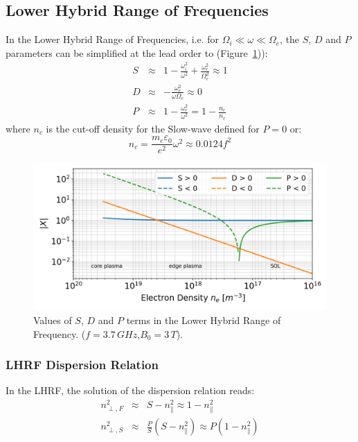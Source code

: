 \subsection{Lower Hybrid Range of Frequencies}\label{sec:lhcd}
In the Lower Hybrid Range of Frequencies, i.e. for $\Omega_i \ll \omega \ll \Omega_e$, the $S$, $D$ and $P$ parameters can be simplified at the lead order \cite[p.222]{Brambilla1998} to (Figure~\ref{fig:lhsdp})):
\begin{subequations}
	\begin{eqnarray}
		S &\approx& 1 - \frac{\omega_i^2}{\omega^2} + \frac{\omega_e^2}{\Omega_e^2} \approx 1 \\
		D &\approx& - \frac{\omega_e^2}{\omega \Omega_e} \approx 0 \\
		P &\approx& 1 - \frac{\omega_e^2}{\omega^2} = 1 - \frac{n_e}{n_c}
	\end{eqnarray}
\end{subequations}
where $n_c$ is the cut-off density for the Slow-wave defined for $P=0$ or:
\begin{equation}
	n_c = \frac{m_e \varepsilon_{0}}{e^2} \omega^2 \approx  0.0124 f^2
	\label{eq:lh_cutoff_density}
\end{equation}
\begin{figure}[h]
	\centering
	\includegraphics[width=1.0\linewidth]{figures/chap2/LH_SDP}
	\caption{Values of $S$, $D$ and $P$ terms in the Lower Hybrid Range of Frequency. ($f=3.7\,\si{GHz}$,$B_0=3\,\si{T}$).}
	\label{fig:lhsdp}
\end{figure}


\subsubsection{LHRF Dispersion Relation}
In the LHRF, the solution of the dispersion relation reads:
\begin{subequations}
	\begin{eqnarray}
		n_{\perp,F}^2 &\approx& S - n_\parallel^2  \approx 1 - n_\parallel^2 \\
		\label{eq:n_perp_square_FW_LHRF}
		n_{\perp,S}^2 &\approx& \frac{P}{S} \left(S - n_\parallel^2\right) \approx P(1- n_\parallel^2)
		\label{eq:n_perp_square_SW_LHRF}
	\end{eqnarray}
	\label{eq:n_perp_square_LHRF}
\end{subequations}

